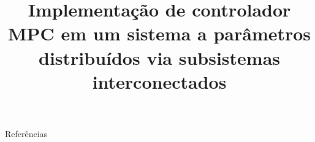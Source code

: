 \documentclass[abnt]{slides}
\title{Implementação de controlador MPC em um sistema a parâmetros distribuídos via subsistemas interconectados}
\begin{document}
    \maketitle{}

    \begin{slide}
        \vfill\null{}
        \begin{minipage}[t][0.6\textheight][t]{.5\textwidth}
            \tableofcontents[sections={1-3}]
        \end{minipage}%
        \begin{minipage}[t][4\baselineskip][t]{.5\textwidth}
            \tableofcontents[sections={4-}]
        \end{minipage}
        \vfill\null{}
    \end{slide}

    
    

    \begin{frame}[allowframebreaks]{Referências}
        \nocite{*}
        \printbibliography{}
    \end{frame}
\end{document}
